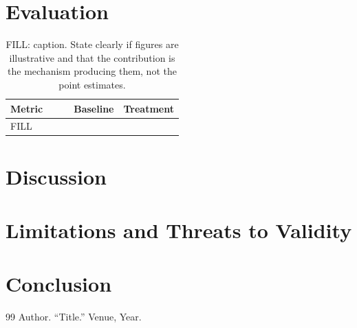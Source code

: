 \documentclass[11pt]{article}
\begin{document}
\section{Evaluation}
\begin{table}[h]\centering\small
\caption{FILL: caption. State clearly if figures are illustrative and that the contribution is the
mechanism producing them, not the point estimates.}
\begin{tabular}{@{}p{0.5\linewidth}rr@{}}
\toprule \textbf{Metric} & \textbf{Baseline} & \textbf{Treatment} \\ \midrule
FILL & & \\ \bottomrule
\end{tabular}
\end{table}

\section{Discussion}

\section{Limitations and Threats to Validity}

\section{Conclusion}

\begin{thebibliography}{99}\small
 Author. ``Title.'' Venue, Year.
\end{thebibliography}
\end{document}
